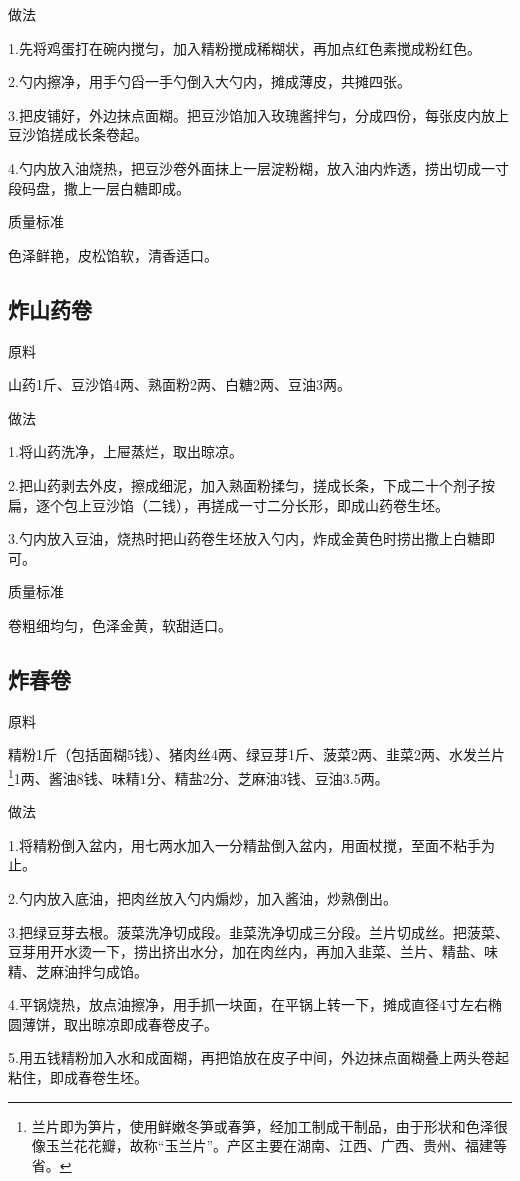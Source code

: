 \documentclass{ctexbook}
\begin{document}
做法

1.先将鸡蛋打在碗内搅匀，加入精粉搅成稀糊状，再加点红色素搅成粉红色。

2.勺内擦净，用手勺舀一手勺倒入大勺内，摊成薄皮，共摊四张。

3.把皮铺好，外边抹点面糊。把豆沙馅加入玫瑰酱拌匀，分成四份，每张皮内放上豆沙馅搓成长条卷起。

4.勺内放入油烧热，把豆沙卷外面抹上一层淀粉糊，放入油内炸透，捞出切成一寸段码盘，撒上一层白糖即成。

质量标准

色泽鲜艳，皮松馅软，清香适口。
\subsection{炸山药卷}
原料

山药1斤、豆沙馅4两、熟面粉2两、白糖2两、豆油3两。

做法

1.将山药洗净，上屉蒸烂，取出晾凉。

2.把山药剥去外皮，擦成细泥，加入熟面粉揉匀，搓成长条，下成二十个剂子按扁，逐个包上豆沙馅（二钱），再搓成一寸二分长形，即成山药卷生坯。

3.勺内放入豆油，烧热时把山药卷生坯放入勺内，炸成金黄色时捞出撒上白糖即可。

质量标准

卷粗细均匀，色泽金黄，软甜适口。
\subsection{炸春卷}
原料

精粉1斤（包括面糊5钱）、猪肉丝4两、绿豆芽1斤、菠菜2两、韭菜2两、水发兰片\footnote{兰片即为笋片，使用鲜嫩冬笋或春笋，经加工制成干制品，由于形状和色泽很像玉兰花花瓣，故称“玉兰片”。产区主要在湖南、江西、广西、贵州、福建等省。}1两、酱油8钱、味精1分、精盐2分、芝麻油3钱、豆油3.5两。

做法

1.将精粉倒入盆内，用七两水加入一分精盐倒入盆内，用面杖搅，至面不粘手为止。

2.勺内放入底油，把肉丝放入勺内煽炒，加入酱油，炒熟倒出。

3.把绿豆芽去根。菠菜洗净切成段。韭菜洗净切成三分段。兰片切成丝。把菠菜、豆芽用开水烫一下，捞出挤出水分，加在肉丝内，再加入韭菜、兰片、精盐、味精、芝麻油拌匀成馅。

4.平锅烧热，放点油擦净，用手抓一块面，在平锅上转一下，摊成直径4寸左右椭圆薄饼，取出晾凉即成春卷皮子。

5.用五钱精粉加入水和成面糊，再把馅放在皮子中间，外边抹点面糊叠上两头卷起粘住，即成春卷生坯。
\end{document}
